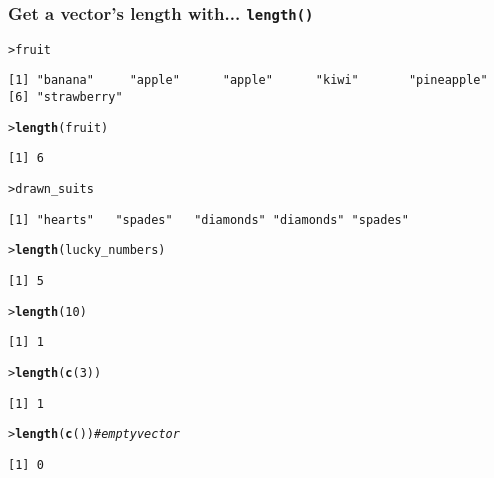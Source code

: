 \documentclass[13pt,aspectratio=169]{beamer}\usepackage[]{graphicx}\usepackage[]{color}
\makeatletter
\newcommand{\hlnum}[1]{\textcolor[rgb]{0.686,0.059,0.569}{#1}}%
\newcommand{\hlcom}[1]{\textcolor[rgb]{0.678,0.584,0.686}{\textit{#1}}}%
\newcommand{\hlstd}[1]{\textcolor[rgb]{0.345,0.345,0.345}{#1}}%
\newcommand{\hlkwd}[1]{\textcolor[rgb]{0.737,0.353,0.396}{\textbf{#1}}}%
\newenvironment{kframe}{%
 \def\at@end@of@kframe{}%
 \ifinner\ifhmode%
  \def\at@end@of@kframe{\end{minipage}}%
  \begin{minipage}{\columnwidth}%
 \fi\fi%
 \def\FrameCommand##1{\hskip\@totalleftmargin \hskip-\fboxsep
 \colorbox{shadecolor}{##1}\hskip-\fboxsep
     \hskip-\linewidth \hskip-\@totalleftmargin \hskip\columnwidth}%
 \MakeFramed {\advance\hsize-\width
   \@totalleftmargin\z@ \linewidth\hsize
   \@setminipage}}%
 {\par\unskip\endMakeFramed%
 \at@end@of@kframe}
\newenvironment{knitrout}{}{} %
\renewcommand{\tt}[1]{\texttt{#1}}
\renewenvironment{knitrout}{\setlength{\topsep}{0mm}}{}
\makeatother
\begin{document}
\begin{frame}[fragile]
    \frametitle{Get a vector's length with... \tt{length()}}
\begin{knitrout}\small
{}\color{fgcolor}\begin{kframe}
\begin{alltt}
\hlstd{> }\hlstd{fruit}
\end{alltt}
\begin{verbatim}
[1] "banana"     "apple"      "apple"      "kiwi"       "pineapple" 
[6] "strawberry"
\end{verbatim}
\begin{alltt}
\hlstd{> }\hlkwd{length}\hlstd{(fruit)}
\end{alltt}
\begin{verbatim}
[1] 6
\end{verbatim}
\begin{alltt}
\hlstd{> }\hlstd{drawn_suits}
\end{alltt}
\begin{verbatim}
[1] "hearts"   "spades"   "diamonds" "diamonds" "spades"  
\end{verbatim}
\begin{alltt}
\hlstd{> }\hlkwd{length}\hlstd{(lucky_numbers)}
\end{alltt}
\begin{verbatim}
[1] 5
\end{verbatim}
\begin{alltt}
\hlstd{> }\hlkwd{length}\hlstd{(}\hlnum{10}\hlstd{)}
\end{alltt}
\begin{verbatim}
[1] 1
\end{verbatim}
\begin{alltt}
\hlstd{> }\hlkwd{length}\hlstd{(}\hlkwd{c}\hlstd{(}\hlnum{3}\hlstd{))}
\end{alltt}
\begin{verbatim}
[1] 1
\end{verbatim}
\begin{alltt}
\hlstd{> }\hlkwd{length}\hlstd{(}\hlkwd{c}\hlstd{())} \hlcom{# empty vector}
\end{alltt}
\begin{verbatim}
[1] 0
\end{verbatim}
\end{kframe}
\end{knitrout}

\end{frame}
\end{document}
